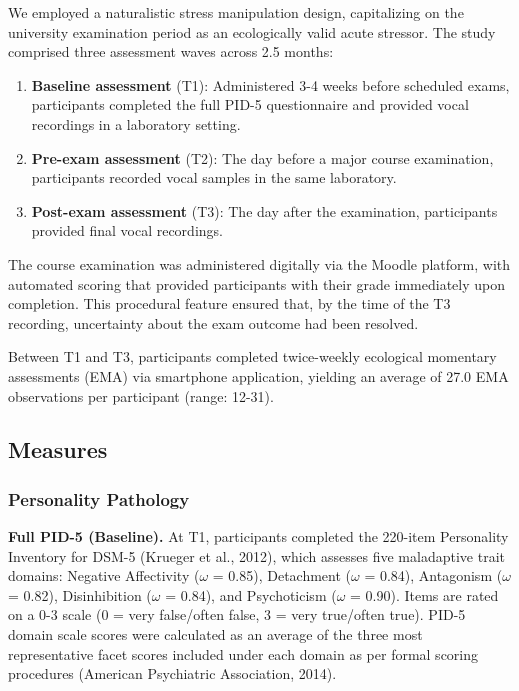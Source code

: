 \documentclass[
  english,
  man]{apa6}
\providecommand{\tightlist}{%
  \setlength{\itemsep}{0pt}\setlength{\parskip}{0pt}}
\begin{document}
We employed a naturalistic stress manipulation design, capitalizing on the university examination period as an ecologically valid acute stressor. The study comprised three assessment waves across 2.5 months:

\begin{enumerate}
\def\labelenumi{\arabic{enumi}.}
\tightlist
\item
  \textbf{Baseline assessment} (T1): Administered 3-4 weeks before scheduled exams, participants completed the full PID-5 questionnaire and provided vocal recordings in a laboratory setting.
\item
  \textbf{Pre-exam assessment} (T2): The day before a major course examination, participants recorded vocal samples in the same laboratory.
\item
  \textbf{Post-exam assessment} (T3): The day after the examination, participants provided final vocal recordings.
\end{enumerate}

The course examination was administered digitally via the Moodle platform, with automated scoring that provided participants with their grade immediately upon completion. This procedural feature ensured that, by the time of the T3 recording, uncertainty about the exam outcome had been resolved.

Between T1 and T3, participants completed twice-weekly ecological momentary assessments (EMA) via smartphone application, yielding an average of 27.0 EMA observations per participant (range: 12-31).

\subsection{Measures}\label{measures}

\subsubsection{Personality Pathology}\label{personality-pathology}

\textbf{Full PID-5 (Baseline).} At T1, participants completed the 220-item Personality Inventory for DSM-5 (Krueger et al., 2012), which assesses five maladaptive trait domains: Negative Affectivity (\(\omega\) = 0.85), Detachment (\(\omega\) = 0.84), Antagonism (\(\omega\) = 0.82), Disinhibition (\(\omega\) = 0.84), and Psychoticism (\(\omega\) = 0.90). Items are rated on a 0-3 scale (0 = very false/often false, 3 = very true/often true). PID-5 domain scale scores were calculated as an average of the three most representative facet scores included under each domain as per formal scoring procedures (American Psychiatric Association, 2014).
\end{document}
